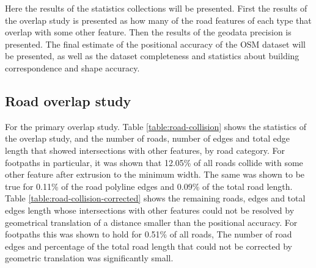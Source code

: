 \documentclass{kththesis}
\begin{document}
Here the results of the statistics collections will be presented.
First the results of the overlap study is presented as how many of the road features of each type that overlap with some other feature.
Then the results of the geodata precision is presented.
The final estimate of the positional accuracy of the OSM dataset will be presented, as well as the dataset completeness and statistics about building correspondence and shape accuracy.

\subsection{Road overlap study}

For the primary overlap study.
Table \ref{table:road-collision} shows the statistics of the overlap study, and the number of roads, number of edges and total edge length that showed intersections with other features, by road category.
For footpaths in particular, it was shown that 12.05\% of all roads collide with some other feature after extrusion to the minimum width.
The same was shown to be true for 0.11\% of the road polyline edges and 0.09\% of the total road length.
Table \ref{table:road-collision-corrected} shows the remaining roads, edges and total edges length whose intersections with other features could not be resolved by geometrical translation of a distance smaller than the positional accuracy.
For footpaths this was shown to hold for 0.51\% of all roads, 
The number of road edges and percentage of the total road length that could not be corrected by geometric translation was significantly small.
\end{document}
